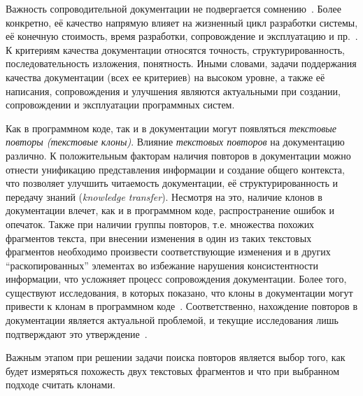 Важность сопроводительной документации не подвергается сомнению~\cite{kipyegen2013importance,chomal2014significance}.
Более конкретно, её качество напрямую влияет на жизненный цикл разработки системы, её конечную стоимость, время разработки, сопровождение и эксплуатацию и пр.~\cite{plosch2014value}. 
К критериям качества документации относятся точность, структурированность, последовательность изложения, понятность.
Иными словами, задачи поддержания качества документации (всех ее критериев) на высоком уровне, а также её написания, сопровождения и улучшения являются актуальными при создании, сопровождении и эксплуатации программных систем.

Как в программном коде, так и в документации могут появляться \emph{текстовые повторы (текстовые клоны)}.
Влияние  \emph{текстовых повторов} на документацию различно.
К положительным факторам наличия {повторов} в документации можно отнести
унификацию представления информации и создание общего контекста, что позволяет улучшить читаемость документации, её структурированность и передачу знаний (\emph{knowledge transfer}).
Несмотря на это, наличие клонов в документации влечет, как и в программном коде,  распространение ошибок и опечаток.
Также при наличии группы повторов, т.е. множества похожих  фрагментов текста, при внесении изменения в один из таких текстовых фрагментов необходимо произвести соответствующие изменения и в других ``раскопированных'' элементах во избежание нарушения консистентности информации, что усложняет процесс сопровождения документации.
Более того, существуют исследования, в которых показано, что клоны в документации могут привести к клонам в программном коде~\cite{juergens2010can}.
Соответственно, нахождение повторов в документации является актуальной проблемой, и текущие исследования лишь подтверждают это утверждение~\cite{horie2010tool, poruban2014reusable, poruban2016preliminary, juergens2010can, oumaziz2017documentation}.

Важным этапом при решении задачи поиска повторов является выбор того, как будет измеряться похожесть двух текстовых фрагментов и что при выбранном подходе считать клонами.

